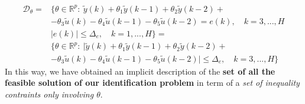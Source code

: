 \begin{equation*} 
    \begin{aligned}
        \mathcal{D}_\theta=&\{\theta\in\mathbb{R}^p: \ 
                \tilde{y}(k)+\theta_1\tilde{y}(k-1)
                +\theta_2\tilde{y}(k-2)+\\
                &-\theta_3\tilde{u}(k)
                -\theta_4\tilde{u}(k-1)
                -\theta_5\tilde{u}(k-2)=e(k), \quad k=3,...,H\\
                &  \vert e(k) \vert \le \Delta_e, \quad k=1,...,H
        \}= \\
        &\{\theta\in\mathbb{R}^p: \ 
                \vert \tilde{y}(k)+\theta_1\tilde{y}(k-1)
                +\theta_2\tilde{y}(k-2)+\\
                &-\theta_3\tilde{u}(k)
                -\theta_4\tilde{u}(k-1)
                -\theta_5\tilde{u}(k-2) \vert \le \Delta_e, \quad k=3,...,H
        \}
    \end{aligned}
\end{equation*}
In this way, we have obtained an implicit description of the \textbf{set of all the feasible solution of our identification problem} in term of a \textit{set of inequality contraints only involving $\theta$}.\\


